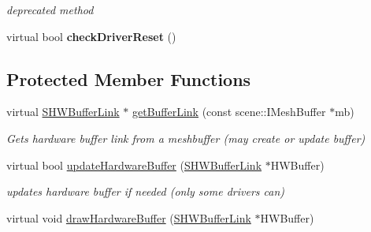 \begin{DoxyCompactItemize}
\begin{DoxyCompactList}\small\item\em deprecated method \end{DoxyCompactList}\item 
\hypertarget{classirr_1_1video_1_1_c_null_driver_a1772b3b4dbea870d8f6676e213979f58}{virtual bool {\bfseries check\-Driver\-Reset} ()}\label{classirr_1_1video_1_1_c_null_driver_a1772b3b4dbea870d8f6676e213979f58}

\end{DoxyCompactItemize}
\subsection*{Protected Member Functions}
\begin{DoxyCompactItemize}
\item 
\hypertarget{classirr_1_1video_1_1_c_null_driver_ac9df633286ec99c7feab5e21426fe989}{virtual \hyperlink{structirr_1_1video_1_1_c_null_driver_1_1_s_h_w_buffer_link}{S\-H\-W\-Buffer\-Link} $\ast$ \hyperlink{classirr_1_1video_1_1_c_null_driver_ac9df633286ec99c7feab5e21426fe989}{get\-Buffer\-Link} (const scene\-::\-I\-Mesh\-Buffer $\ast$mb)}\label{classirr_1_1video_1_1_c_null_driver_ac9df633286ec99c7feab5e21426fe989}

\begin{DoxyCompactList}\small\item\em Gets hardware buffer link from a meshbuffer (may create or update buffer) \end{DoxyCompactList}\item 
\hypertarget{classirr_1_1video_1_1_c_null_driver_afa50dd54de259a814082fdeeb8c07d3e}{virtual bool \hyperlink{classirr_1_1video_1_1_c_null_driver_afa50dd54de259a814082fdeeb8c07d3e}{update\-Hardware\-Buffer} (\hyperlink{structirr_1_1video_1_1_c_null_driver_1_1_s_h_w_buffer_link}{S\-H\-W\-Buffer\-Link} $\ast$H\-W\-Buffer)}\label{classirr_1_1video_1_1_c_null_driver_afa50dd54de259a814082fdeeb8c07d3e}

\begin{DoxyCompactList}\small\item\em updates hardware buffer if needed (only some drivers can) \end{DoxyCompactList}\item 
\hypertarget{classirr_1_1video_1_1_c_null_driver_aa22c7942c97156f60d8624e824b043b3}{virtual void \hyperlink{classirr_1_1video_1_1_c_null_driver_aa22c7942c97156f60d8624e824b043b3}{draw\-Hardware\-Buffer} (\hyperlink{structirr_1_1video_1_1_c_null_driver_1_1_s_h_w_buffer_link}{S\-H\-W\-Buffer\-Link} $\ast$H\-W\-Buffer)}\label{classirr_1_1video_1_1_c_null_driver_aa22c7942c97156f60d8624e824b043b3}


\end{DoxyCompactItemize}
